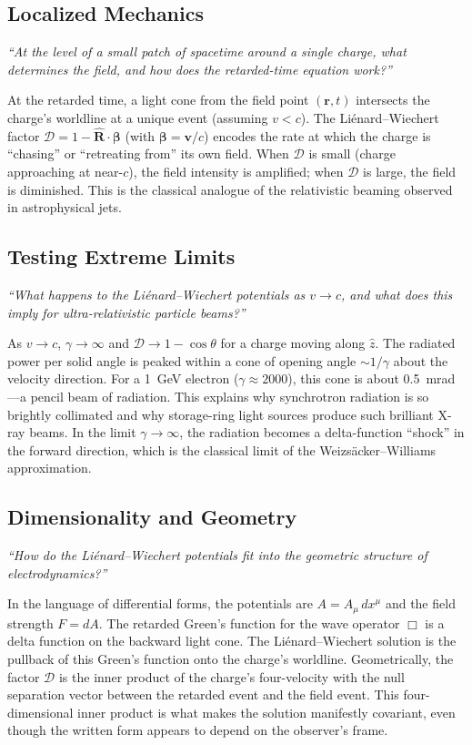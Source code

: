 \subsection*{Localized Mechanics}
\textit{``At the level of a small patch of spacetime around a single charge, what determines the field, and how does the retarded-time equation work?''}

At the retarded time, a light cone from the field point $(\mathbf{r}, t)$ intersects the charge's worldline at a unique event (assuming $v < c$). The Liénard--Wiechert factor $\mathcal{D} = 1 - \hat{\mathbf{R}}\cdot\boldsymbol{\beta}$ (with $\boldsymbol{\beta} = \mathbf{v}/c$) encodes the rate at which the charge is ``chasing'' or ``retreating from'' its own field. When $\mathcal{D}$ is small (charge approaching at near-$c$), the field intensity is amplified; when $\mathcal{D}$ is large, the field is diminished. This is the classical analogue of the relativistic beaming observed in astrophysical jets.

\subsection*{Testing Extreme Limits}
\textit{``What happens to the Liénard--Wiechert potentials as $v \to c$, and what does this imply for ultra-relativistic particle beams?''}

As $v \to c$, $\gamma \to \infty$ and $\mathcal{D} \to 1 - \cos\theta$ for a charge moving along $\hat{z}$. The radiated power per solid angle is peaked within a cone of opening angle $\sim 1/\gamma$ about the velocity direction. For a 1~GeV electron ($\gamma \approx 2000$), this cone is about 0.5~mrad---a pencil beam of radiation. This explains why synchrotron radiation is so brightly collimated and why storage-ring light sources produce such brilliant X-ray beams. In the limit $\gamma \to \infty$, the radiation becomes a delta-function ``shock'' in the forward direction, which is the classical limit of the Weizsäcker--Williams approximation.

\subsection*{Dimensionality and Geometry}
\textit{``How do the Liénard--Wiechert potentials fit into the geometric structure of electrodynamics?''}

In the language of differential forms, the potentials are $A = A_{\mu}\,dx^{\mu}$ and the field strength $F = dA$. The retarded Green's function for the wave operator $\Box$ is a delta function on the backward light cone. The Liénard--Wiechert solution is the pullback of this Green's function onto the charge's worldline. Geometrically, the factor $\mathcal{D}$ is the inner product of the charge's four-velocity with the null separation vector between the retarded event and the field event. This four-dimensional inner product is what makes the solution manifestly covariant, even though the written form appears to depend on the observer's frame.


